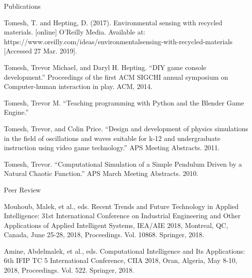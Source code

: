 \documentclass{resume} %
\begin{document}
\begin{rSection}{Publications}

Tomesh, T. and Hepting, D. (2017). Environmental sensing with recycled materials.
[online] O'Reilly Media. Available at: https://www.oreilly.com/ideas/environmentalsensing-with-recycled-materials [Accessed 27 Mar. 2019].

Tomesh, Trevor Michael, and Daryl H. Hepting. ``DIY game console development.''
Proceedings of the first ACM SIGCHI annual symposium on Computer-human
interaction in play. ACM, 2014.

Tomesh, Trevor M. ``Teaching programming with Python and the Blender Game
Engine.''

Tomesh, Trevor, and Colin Price. ``Design and development of physics simulations in
the field of oscillations and waves suitable for k-12 and undergraduate instruction
using video game technology.'' APS Meeting Abstracts. 2011.

Tomesh, Trevor. ``Computational Simulation of a Simple Pendulum Driven by a
Natural Chaotic Function.'' APS March Meeting Abstracts. 2010.
\end{rSection}

\begin{rSection}{Peer Review}

Mouhoub, Malek, et al., eds. Recent Trends and Future Technology in Applied
Intelligence: 31st International Conference on Industrial Engineering and Other
Applications of Applied Intelligent Systems, IEA/AIE 2018, Montreal, QC, Canada,
June 25-28, 2018, Proceedings. Vol. 10868. Springer, 2018.

Amine, Abdelmalek, et al., eds. Computational Intelligence and Its Applications: 6th
IFIP TC 5 International Conference, CIIA 2018, Oran, Algeria, May 8-10, 2018,
Proceedings. Vol. 522. Springer, 2018.
\end{rSection}
\end{document}
